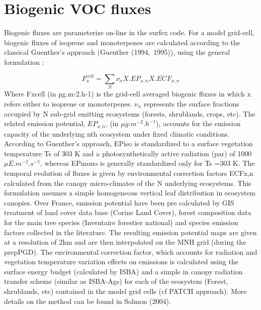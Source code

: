 \section{Biogenic VOC fluxes}
Biogenic fluxes are parameterize on-line in the surfex code.
For a model grid-cell, biogenic fluxes of isoprene and monoterpenes are calculated according to the classical Guenther’s approach (Guenther \etal (1994,~1995)\nocite{Guenther1994,Guenther1995}), using the general formulation :

\begin{equation}
F^{cell}_x =  \sum_{N} \nu_n  X . EP_{x,n} X . ECF_{x,n}
\label{biogenic}
\end{equation}
Where Fxcell (in µg.m-2.h-1) is the grid-cell averaged biogenic fluxes in which x refers either to isoprene or monoterpenes. $\nu_n$ represents the surface fractions occupied by N sub-grid emitting ecosystems (forests, shrublands, crops, etc). The related emission potential, $EP_{x,n}$, (in $\mu g.m^{-2}.h^{-1}$), accounts for the emission capacity of the underlying nth ecosystem under fixed climatic conditions. According to Guenther’s approach, EPiso is standardized to a surface vegetation temperature Ts of 303 K and a photosynthetically active radiation (par) of 1000 $\mu E.m^{-2}.s^{-1} $, whereas EPmono is generally standardized only for Ts =303 K. The temporal evolution of fluxes is given by environmental correction factors ECFx,n calculated from the canopy micro-climates of the N underlying ecosystems. This formulation assumes a simple homogeneous vertical leaf distribution in ecosystem canopies.
Over France, emission potential have been pre calculated by GIS treatment of land cover data base (Corine Land Cover), forest composition data for the main tree species (Inventaire forestier national) and species emission factors collected in the literature. The resulting emission potential maps are given at a resolution of 2km and are then interpolated on the MNH grid (during the prepPGD).
The environmental correction factor, which accounts for radiation and vegetation temperature variation effects on emissions is calculated using the surface energy budget (calculated by ISBA) and a simple in canopy radiation transfer scheme (similar as ISBA-Ags) for each of the ecosystem (Forest, shrublands, etc) contained in the model grid cells (cf PATCH approach). More details on the method can be found in Solmon \etal (2004)\nocite{Solmon2004}. 


